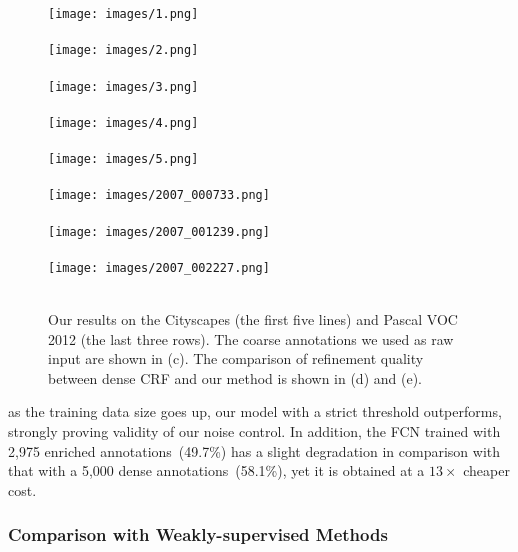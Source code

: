 \documentclass[sigconf]{acmart}
\begin{document}
\begin{figure*}[!htb]
{\begin{minipage}[b]{0.18\textwidth}
			\texttt{[image: images/1.png]}\\
			\vspace{-0.3cm}\\
			\texttt{[image: images/2.png]}\\
			\vspace{-0.3cm}\\
			\texttt{[image: images/3.png]}\\
			\vspace{-0.3cm}\\
			\texttt{[image: images/4.png]}\\
			\vspace{-0.3cm}\\
			\texttt{[image: images/5.png]}\\
			\vspace{-0.3cm}\\
			\texttt{[image: images/2007\_000733.png]}\\
			\vspace{-0.3cm}\\
			\texttt{[image: images/2007\_001239.png]}\\
			\vspace{-0.3cm}\\
			\texttt{[image: images/2007\_002227.png]}\\
			\vspace{-0.9cm}\\
		\end{minipage}
	}
	\caption{Our results on the Cityscapes (the first five lines) and Pascal VOC 2012 (the last three rows). The coarse annotations we used as raw input are shown in (c). The comparison of refinement quality between dense CRF and our method is shown in (d) and (e).}
	\label{fig:city_samples}
\end{figure*}
 as the training data size goes up, our model with a strict threshold outperforms, strongly proving validity of our noise control. In addition, the FCN trained with 2,975 enriched annotations~(49.7\%) has a slight degradation in comparison with that with a 5,000 dense annotations~(58.1\%), yet it is obtained at a $13\times$ cheaper cost.
\subsubsection{Comparison with Weakly-supervised Methods}
\end{document}
